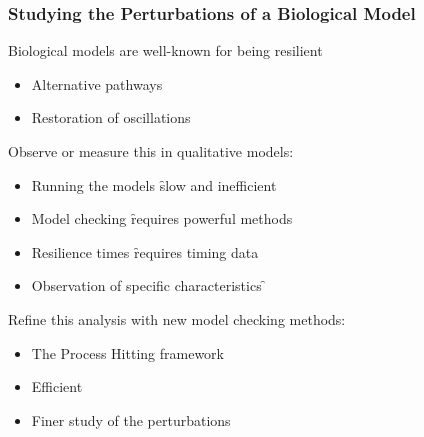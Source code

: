 
\begin{frame}[c]
\frametitle{Studying the Perturbations of a Biological Model}

Biological models are well-known for being resilient
\begin{itemize}
  \item Alternative pathways
  \item Restoration of oscillations
\end{itemize}

\bigskip
\pause
Observe or measure this in qualitative models:
\begin{itemize}
  \item Running the models \f slow and inefficient
  \item Model checking \f requires powerful methods
  \item Resilience times \f requires timing data
  \item Observation of specific characteristics \f {}
\end{itemize}

\bigskip
\pause
Refine this analysis with new model checking methods:
\begin{itemize}
  \item The Process Hitting framework
  \item Efficient 
  \item Finer study of the perturbations
\end{itemize}
\end{frame}

